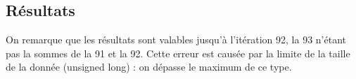\documentclass[a4paper]{article}
\begin{document}
\subsection{Résultats}

On remarque que les résultats sont valables jusqu'à l'itération 92, la 93 n'étant pas la sommes de la 91 et la 92.
Cette erreur est causée par la limite de la taille de la donnée (unsigned long) : on dépasse le maximum de ce type.

\begin{mdframed}[backgroundcolor=light-gray, roundcorner=20pt,
	leftmargin=-45, rightmargin=-45, 
	innerleftmargin=20, innertopmargin=1, innerbottommargin=1, 
	outerlinewidth=1, linecolor=darkgray]
	
\end{mdframed}
\end{document}
